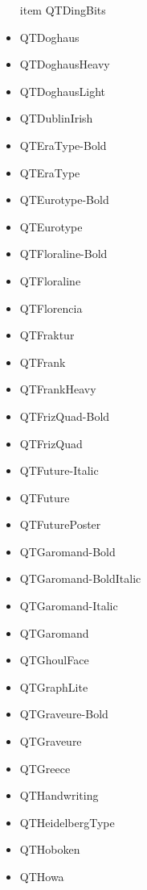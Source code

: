 \documentclass[12pt]{article}
\begin{document}
\begin{itemize}
item QTDingBits\item QTDoghaus\item QTDoghausHeavy\item QTDoghausLight\item QTDublinIrish\item QTEraType-Bold\item QTEraType\item QTEurotype-Bold\item QTEurotype\item QTFloraline-Bold\item QTFloraline\item QTFlorencia\item QTFraktur\item QTFrank\item QTFrankHeavy\item QTFrizQuad-Bold\item QTFrizQuad\item QTFuture-Italic\item QTFuture\item QTFuturePoster\item QTGaromand-Bold\item QTGaromand-BoldItalic\item QTGaromand-Italic\item QTGaromand\item QTGhoulFace\item QTGraphLite\item QTGraveure-Bold\item QTGraveure\item QTGreece\item QTHandwriting\item QTHeidelbergType\item QTHoboken\item QTHowa
\end{itemize}
\end{document}
